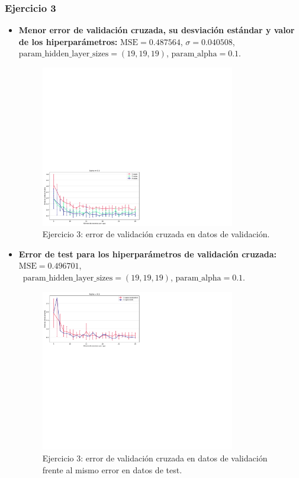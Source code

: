 \documentclass[11pt]{article}
\begin{document}
\subsubsection*{Ejercicio 3}

\begin{itemize}
    \item \textbf{Menor error de validación cruzada, su desviación estándar y valor de los hiperparámetros:} $\text{MSE} = 0.487564$, $\sigma = 0.040508$, $\text{param\_hidden\_layer\_sizes} = (19, 19, 19)$, $\text{param\_alpha} = 0.1$.
    \begin{figure}[h]
    \centering
    \includegraphics[width=0.8\textwidth]{fotos/ej3_1.pdf}
    \caption{Ejercicio 3: error de validación cruzada en datos de validación.}
    \end{figure}
    \item \textbf{Error de test para los hiperparámetros de validación cruzada:} $\text{MSE} = 0.496701$, \\ $\text{param\_hidden\_layer\_sizes} = (19, 19, 19)$, $\text{param\_alpha} = 0.1$.
    \begin{figure}[h]
    \centering
    \includegraphics[width=0.8\textwidth]{fotos/ej3_2.pdf}
    \caption{Ejercicio 3: error de validación cruzada en datos de validación frente al mismo error en datos de test.}
    \end{figure}
\end{itemize}
\end{document}
